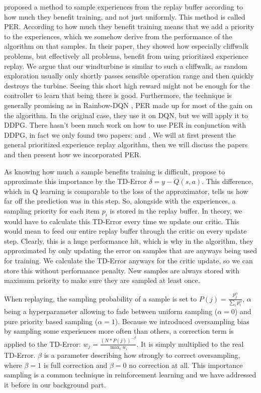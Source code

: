 \documentclass[hyperref,german,beleg]{cgvpub}
\begin{document}
\cite{schaulPrioritizedExperienceReplay2016} proposed a method to sample experiences from the replay buffer according to how much they benefit training, and not just uniformly. This method is called \ac{PER}. According to how much they benefit training means that we add a priority to the experiences, which we somehow derive from the performance of the algorithm on that samples. In their paper, they showed how especially cliffwalk problems, but effectively all problems, benefit from using prioritized experience replay. We argue that our windturbine is similar to such a cliffwalk, as random exploration usually only shortly passes sensible operation range and then quickly destroys the turbine. Seeing this short high reward might not be enough for the controller to learn that being there is good. Furthermore, the technique is generally promising as in Rainbow-\ac{DQN} \cite{hesselRainbowCombiningImprovements2017}, \ac{PER} made up for most of the gain on the algorithm. In the original case, they use it on \ac{DQN}, but we will apply it to \ac{DDPG}. There hasn't been much work on how to use \ac{PER} in conjunction with \ac{DDPG}, in fact we only found two papers: \cite{houImprovingDDPGPrioritized} and \cite{zhaExperienceReplayOptimization2019}. We will at first present the general prioritized experience replay algorithm, then we will discuss the papers and then present how we incorporated \ac{PER}.

As knowing how much a sample benefits training is difficult, \cite{schaulPrioritizedExperienceReplay2016} propose to approximate this importance by the \ac{TD-Error} $\delta = y - Q(s, a)$. This difference, which in Q learning is comparable to the loss of the approximator, tells us how far off the prediction was in this step. So, alongside with the experiences, a sampling priority for each item $p_i$ is stored in the replay buffer. In theory, we would have to calculate this \ac{TD-Error} every time we update our critic. This would mean to feed our entire replay buffer through the critic on every update step. Clearly, this is a huge performance hit, which is why in the algorithm, they approximated by only updating the error on samples that are anyways being used for training. We calculate the \ac{TD-Error} anyways for the critic update, so we can store this without performance penalty. New samples are always stored with maximum priority to make sure they are sampled at least once.

When replaying, the sampling probability of a sample is set to $P(j) = \frac{p_j^{\alpha}}{\sum_i{p_i^{\alpha}}}$, $\alpha$ being a hyperparameter allowing to fade between uniform sampling ($\alpha=0$) and pure priority based sampling ($\alpha=1$). Because we introduced oversampling bias by sampling some experiences more often than others, a correction term is applied to the \ac{TD-Error}: $w_j = \frac{(N*P(j))^{-\beta}}{\max_i{w_i}}$. It is simply multiplied to the real \ac{TD-Error}. $\beta$ is a parameter describing how strongly to correct oversampling, where $\beta=1$ is full correction and $\beta=0$ no correction at all. This importance sampling is a common technique in reinforcement learning and we have addressed it before in our background part.
\end{document}
